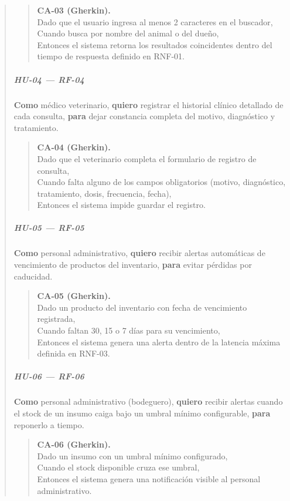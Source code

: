 \documentclass[
]{article}
\begin{document}
\begin{quote}
\begin{quote}
\textbf{CA-03 (Gherkin).} \\
Dado que el usuario ingresa al menos 2 caracteres en el buscador, \\
Cuando busca por nombre del animal o del dueño, \\
Entonces el sistema retorna los resultados coincidentes dentro del tiempo de respuesta definido en RNF-01.
\end{quote}

\subparagraph{HU-04 --- RF-04}
\textbf{Como} médico veterinario,
\textbf{quiero} registrar el historial clínico detallado de cada consulta,
\textbf{para} dejar constancia completa del motivo, diagnóstico y tratamiento.

\begin{quote}
\textbf{CA-04 (Gherkin).} \\
Dado que el veterinario completa el formulario de registro de consulta, \\
Cuando falta alguno de los campos obligatorios (motivo, diagnóstico, tratamiento, dosis, frecuencia, fecha), \\
Entonces el sistema impide guardar el registro.
\end{quote}

\subparagraph{HU-05 --- RF-05}
\textbf{Como} personal administrativo,
\textbf{quiero} recibir alertas automáticas de vencimiento de productos del inventario,
\textbf{para} evitar pérdidas por caducidad.

\begin{quote}
\textbf{CA-05 (Gherkin).} \\
Dado un producto del inventario con fecha de vencimiento registrada, \\
Cuando faltan 30, 15 o 7 días para su vencimiento, \\
Entonces el sistema genera una alerta dentro de la latencia máxima definida en RNF-03.
\end{quote}

\subparagraph{HU-06 --- RF-06}
\textbf{Como} personal administrativo (bodeguero),
\textbf{quiero} recibir alertas cuando el stock de un insumo caiga bajo un umbral mínimo configurable,
\textbf{para} reponerlo a tiempo.

\begin{quote}
\textbf{CA-06 (Gherkin).} \\
Dado un insumo con un umbral mínimo configurado, \\
Cuando el stock disponible cruza ese umbral, \\
Entonces el sistema genera una notificación visible al personal administrativo.
\end{quote}


\end{quote}
\end{document}
